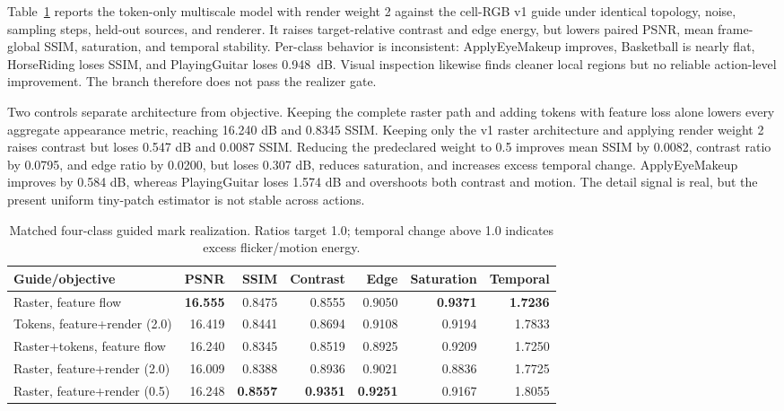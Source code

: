 \documentclass[10pt]{article}
\begin{document}
Table~\ref{tab:multiscale} reports the token-only multiscale model with render weight 2 against the
cell-RGB v1 guide under identical topology, noise, sampling steps, held-out sources, and renderer.
It raises target-relative contrast and edge energy, but lowers paired PSNR, mean frame-global SSIM,
saturation, and temporal stability. Per-class behavior is inconsistent: ApplyEyeMakeup improves,
Basketball is nearly flat, HorseRiding loses SSIM, and PlayingGuitar loses \SI{0.948}{dB}. Visual
inspection likewise finds cleaner local regions but no reliable action-level improvement. The
branch therefore does not pass the realizer gate.

Two controls separate architecture from objective. Keeping the complete raster path and adding
tokens with feature loss alone lowers every aggregate appearance metric, reaching 16.240 dB and
0.8345 SSIM. Keeping only the v1 raster architecture and applying render weight 2 raises contrast
but loses 0.547 dB and 0.0087 SSIM. Reducing the predeclared weight to 0.5 improves mean SSIM by
0.0082, contrast ratio by 0.0795, and edge ratio by 0.0200, but loses 0.307 dB, reduces saturation,
and increases excess temporal change. ApplyEyeMakeup improves by 0.584 dB, whereas PlayingGuitar
loses 1.574 dB and overshoots both contrast and motion. The detail signal is real, but the present
uniform tiny-patch estimator is not stable across actions.

\begin{table}[H]
\centering
\small
\caption{Matched four-class guided mark realization. Ratios target 1.0; temporal change above 1.0
indicates excess flicker/motion energy.}
\label{tab:multiscale}
\begin{tabular}{@{}lrrrrrr@{}}
\toprule
Guide/objective & PSNR & SSIM & Contrast & Edge & Saturation & Temporal \\
\midrule
Raster, feature flow & \textbf{16.555} & 0.8475 & 0.8555 & 0.9050 & \textbf{0.9371} & \textbf{1.7236} \\
Tokens, feature+render (2.0) & 16.419 & 0.8441 & 0.8694 & 0.9108 & 0.9194 & 1.7833 \\
Raster+tokens, feature flow & 16.240 & 0.8345 & 0.8519 & 0.8925 & 0.9209 & 1.7250 \\
Raster, feature+render (2.0) & 16.009 & 0.8388 & 0.8936 & 0.9021 & 0.8836 & 1.7725 \\
Raster, feature+render (0.5) & 16.248 & \textbf{0.8557} & \textbf{0.9351} & \textbf{0.9251} & 0.9167 & 1.8055 \\
\bottomrule
\end{tabular}
\end{table}
\end{document}
